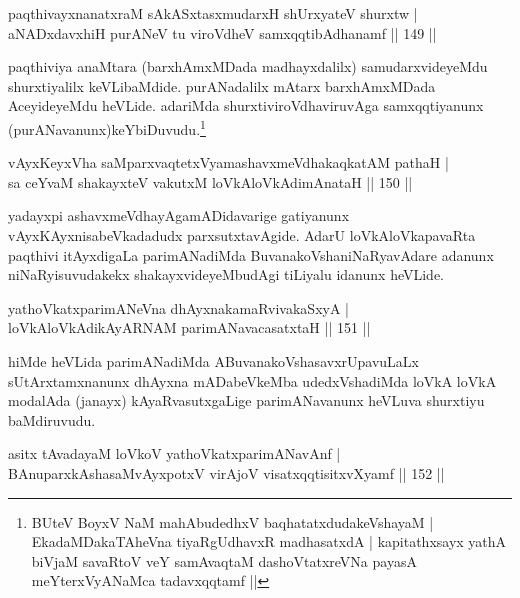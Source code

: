 
\begin{shl}
paqthivayxnanatxraM sAkASxtasxmudarxH shUrxyateV shurxtw |\\
aNADxdavxhiH purANeV tu viroVdheV samxqqtibAdhanamf \hfill || 149 ||
\end{shl}

\begin{artha}
paqthiviya anaMtara (barxhAmxMDada madhayxdalilx) samudarxvideyeMdu shurxtiyalilx keVLibaMdide. purANadalilx mAtarx barxhAmxMDada AceyideyeMdu heVLide. adariMda shurxtiviroVdhaviruvAga samxqqtiyanunx (purANavanunx)keYbiDuvudu.\footnote{BUteV BoyxV NaM mahAbudedhxV baqhatatxdudakeVshayaM |
 EkadaMDakaTAheVna tiyaRgUdhavxR madhasatxdA |
 kapitathxsayx yathA biVjaM savaRtoV veY samAvaqtaM
 dashoVtatxreVNa payasA meYterxVyANaMca tadavxqqtamf ||}
\end{artha}

\begin{shl}
vAyxKeyxVha saMparxvaqtetxVyamashavxmeVdhakaqkatAM pathaH |\\
sa ceYvaM shakayxteV vakutxM loVkAloVkAdimAnataH \hfill || 150 ||
\end{shl}

\begin{artha}
yadayxpi ashavxmeVdhayAgamADidavarige gatiyanunx vAyxKAyxnisabeVkadadudx parxsutxtavAgide. AdarU loVkAloVkapavaRta paqthivi itAyxdigaLa parimANadiMda BuvanakoVshaniNaRyavAdare adanunx niNaRyisuvudakekx shakayxvideyeMbudAgi tiLiyalu idanunx heVLide.
\end{artha}


\begin{shl}
yathoVkatxparimANeVna dhAyxnakamaRvivakaSxyA |\\
loVkAloVkAdikAyARNAM parimANavacasatxtaH \hfill || 151 ||
\end{shl}

\begin{artha}
hiMde heVLida parimANadiMda ABuvanakoVshasavxrUpavuLaLx sUtArxtamxnanunx dhAyxna mADabeVkeMba udedxVshadiMda loVkA loVkA modalAda (janayx) kAyaRvasutxgaLige parimANavanunx heVLuva shurxtiyu baMdiruvudu.
\end{artha}


\begin{shl}
asitx tAvadayaM loVkoV yathoVkatxparimANavAnf |\\
BAnuparxkAshasaMvAyxpotxV virAjoV visatxqqtisitxvXyamf \hfill || 152 ||
\end{shl}

